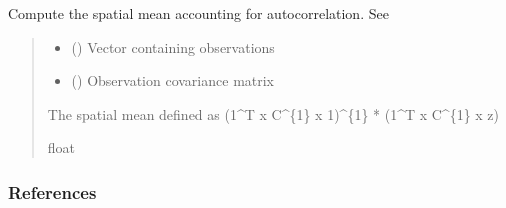 \documentclass[letterpaper,10pt,english]{sphinxmanual}
\begin{document}
\begin{fulllineitems}
\label{\detokenize{misc:glomar_gridding.utils.get_spatial_mean}}
\pysigstartsignatures
\pysiglinewithargsret
{}
{\sphinxparamcomma {}}
{}
\pysigstopsignatures
\sphinxAtStartPar
Compute the spatial mean accounting for auto\sphinxhyphen{}correlation. See 
\begin{quote}\begin{description}
\begin{itemize}
\item {}
\sphinxAtStartPar
{} () \textendash{} Vector containing observations

\item {}
\sphinxAtStartPar
{} () \textendash{} Observation covariance matrix

\end{itemize}

\sphinxAtStartPar
{} \textendash{} The spatial mean defined as (1\textasciicircum{}T x C\textasciicircum{}\{\sphinxhyphen{}1\} x 1)\textasciicircum{}\{\sphinxhyphen{}1\} * (1\textasciicircum{}T x C\textasciicircum{}\{\sphinxhyphen{}1\} x z)

\sphinxAtStartPar
float

\end{description}\end{quote}
\subsubsection*{References}

\sphinxAtStartPar
{} 

\end{fulllineitems}

\end{document}
